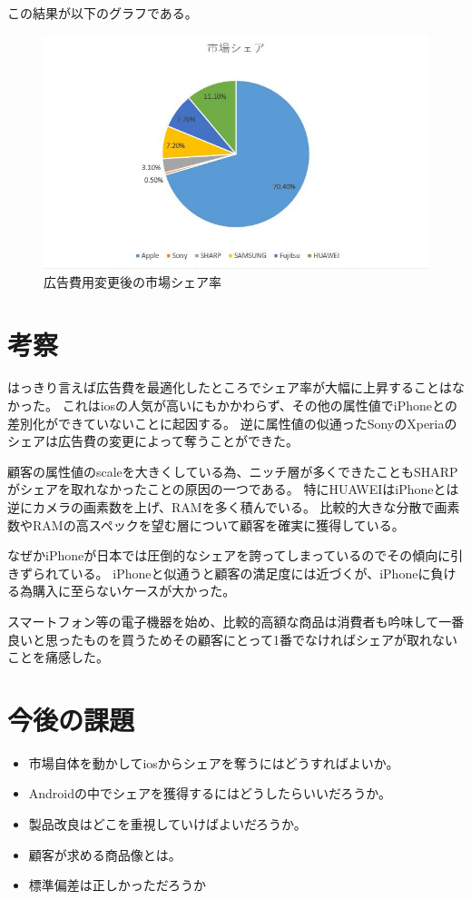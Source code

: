 \documentclass{jarticle}
\begin{document}
この結果が以下のグラフである。
\begin{figure}[H]
	\centering
	\includegraphics[width=15cm]{share_change.jpg}
	\caption{広告費用変更後の市場シェア率}
\end{figure}

\section{考察}
はっきり言えば広告費を最適化したところでシェア率が大幅に上昇することはなかった。
これはiosの人気が高いにもかかわらず、その他の属性値でiPhoneとの差別化ができていないことに起因する。
逆に属性値の似通ったSonyのXperiaのシェアは広告費の変更によって奪うことができた。

顧客の属性値のscaleを大きくしている為、ニッチ層が多くできたこともSHARPがシェアを取れなかったことの原因の一つである。
特にHUAWEIはiPhoneとは逆にカメラの画素数を上げ、RAMを多く積んでいる。
比較的大きな分散で画素数やRAMの高スペックを望む層について顧客を確実に獲得している。

なぜかiPhoneが日本では圧倒的なシェアを誇ってしまっているのでその傾向に引きずられている。
iPhoneと似通うと顧客の満足度には近づくが、iPhoneに負ける為購入に至らないケースが大かった。

スマートフォン等の電子機器を始め、比較的高額な商品は消費者も吟味して一番良いと思ったものを買うためその顧客にとって1番でなければシェアが取れないことを痛感した。

\section{今後の課題}
\begin{itemize}
\item 市場自体を動かしてiosからシェアを奪うにはどうすればよいか。
\item Androidの中でシェアを獲得するにはどうしたらいいだろうか。
\item 製品改良はどこを重視していけばよいだろうか。
\item 顧客が求める商品像とは。
\item 標準偏差は正しかっただろうか
\end{itemize}
\end{document}
